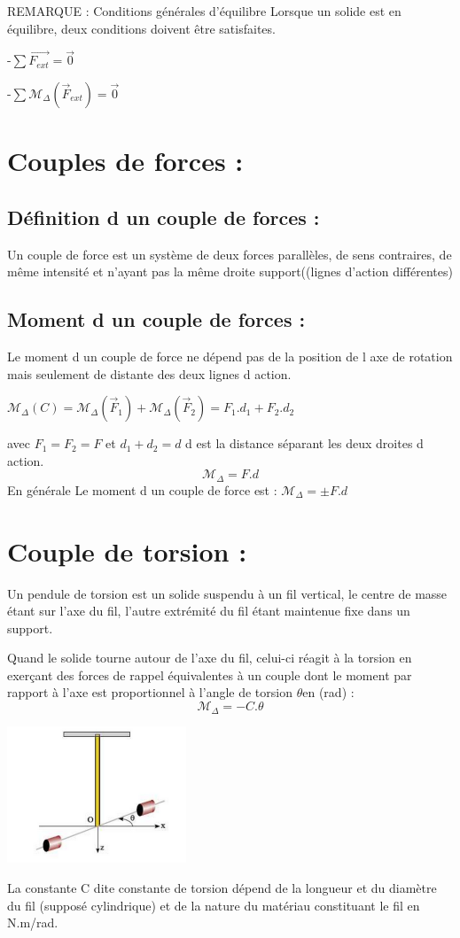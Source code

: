 \documentclass[12pt]{article}
\begin{document}
\vspace{0.2cm}
REMARQUE : Conditions générales d'équilibre
Lorsque un solide est en équilibre, deux conditions doivent être satisfaites.

-$\sum{\vec{F_{ext}}} = \vec{0}$

-$\sum\mathscr{M}_{\Delta}(\vec{F}_{ext}) = \vec{0}$
\section{Couples de forces : }
\subsection{Définition d un couple de forces : }

Un couple de force est un système de deux forces parallèles, de sens contraires, de même intensité et n'ayant
pas la même droite support((lignes d'action différentes)

\subsection{Moment d un couple de forces : }
Le moment d un couple de force ne dépend pas de la position de l axe de rotation mais seulement de
distante des deux lignes d action.

$\mathscr{M}_{\Delta}(C) = \mathscr{M}_{\Delta}(\vec{F}_1) + \mathscr{M}_{\Delta}(\vec{F}_2) = F_1.d_1 + F_2.d_2$

avec $F_1 = F_2 = F$ et $d_1 + d_2 = d$ d est la distance séparant les deux droites d action.
$$
  \mathscr{M}_\Delta = F.d
$$
En générale Le moment d un couple de force est : $\mathscr{M}_\Delta =\pm F.d$
\section{Couple de torsion : }

Un pendule de torsion est un solide suspendu à un fil vertical, le centre de masse étant sur l'axe du fil, l'autre
extrémité du fil étant maintenue fixe dans un support.

Quand le solide tourne autour de l'axe du fil, celui-ci réagit à la torsion en exerçant des forces de rappel équivalentes à un couple dont le moment par rapport à l'axe est proportionnel à l'angle de torsion $\theta$en (rad) :
$$
\mathscr{M}_\Delta =-C.\theta
$$
\begin{center}
\includegraphics[width=0.4\textwidth]{./img/img_04.png}\\
\end{center}
La constante C dite constante de torsion dépend de la longueur et du diamètre du fil (supposé cylindrique) et
de la nature du matériau constituant le fil en N.m/rad.
\end{document}
